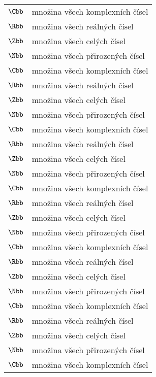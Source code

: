 \begin{flushleft}
\begin{longtable}[l]{ll}
  $\Cbb$                 & množina všech komplexních čísel \\[1mm]
  $\Rbb$                 & množina všech reálných čísel \\[1mm]
  $\Zbb$                 & množina všech celých čísel \\[1mm]
  $\Nbb$                 & množina všech přirozených čísel\\[1mm]
  $\Cbb$                 & množina všech komplexních čísel \\[1mm]
  $\Rbb$                 & množina všech reálných čísel \\[1mm]
  $\Zbb$                 & množina všech celých čísel \\[1mm]
  $\Nbb$                 & množina všech přirozených čísel\\[1mm]
  $\Cbb$                 & množina všech komplexních čísel \\[1mm]
  $\Rbb$                 & množina všech reálných čísel \\[1mm]
  $\Zbb$                 & množina všech celých čísel \\[1mm]
  $\Nbb$                 & množina všech přirozených čísel\\[1mm]
  $\Cbb$                 & množina všech komplexních čísel \\[1mm]
  $\Rbb$                 & množina všech reálných čísel \\[1mm]
  $\Zbb$                 & množina všech celých čísel \\[1mm]
  $\Nbb$                 & množina všech přirozených čísel\\[1mm]
  $\Cbb$                 & množina všech komplexních čísel \\[1mm]
  $\Rbb$                 & množina všech reálných čísel \\[1mm]
  $\Zbb$                 & množina všech celých čísel \\[1mm]
  $\Nbb$                 & množina všech přirozených čísel\\[1mm]  
  $\Cbb$                 & množina všech komplexních čísel \\[1mm]
  $\Rbb$                 & množina všech reálných čísel \\[1mm]
  $\Zbb$                 & množina všech celých čísel \\[1mm]
  $\Nbb$                 & množina všech přirozených čísel\\[1mm]
  $\Cbb$                 & množina všech komplexních čísel \\[1mm]

\end{longtable}
\end{flushleft}
